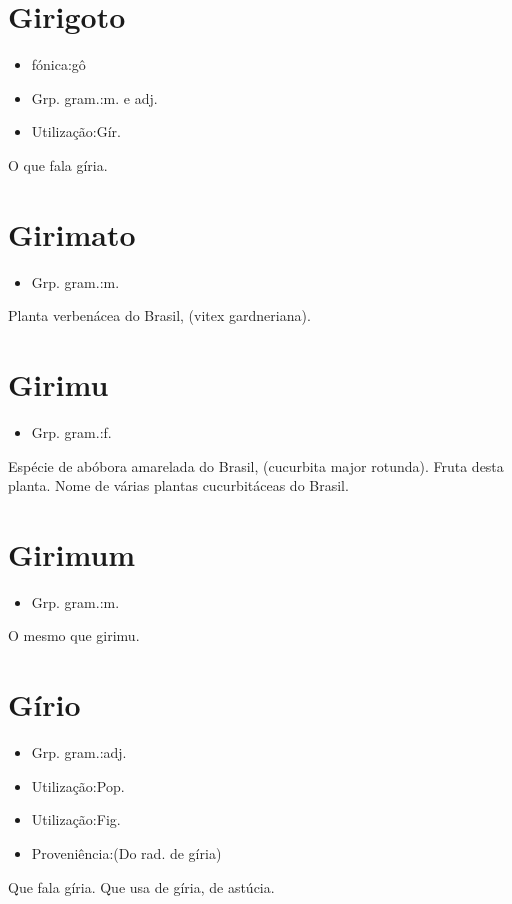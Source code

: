 \section{Girigoto}
\begin{itemize}
\item {fónica:gô}
\end{itemize}
\begin{itemize}
\item {Grp. gram.:m.  e  adj.}
\end{itemize}
\begin{itemize}
\item {Utilização:Gír.}
\end{itemize}
O que fala gíria.
\section{Girimato}
\begin{itemize}
\item {Grp. gram.:m.}
\end{itemize}
Planta verbenácea do Brasil, (\textunderscore vitex gardneriana\textunderscore ).
\section{Girimu}
\begin{itemize}
\item {Grp. gram.:f.}
\end{itemize}
Espécie de abóbora amarelada do Brasil, (\textunderscore cucurbita major rotunda\textunderscore ).
Fruta desta planta.
Nome de várias plantas cucurbitáceas do Brasil.
\section{Girimum}
\begin{itemize}
\item {Grp. gram.:m.}
\end{itemize}
O mesmo que \textunderscore girimu\textunderscore .
\section{Gírio}
\begin{itemize}
\item {Grp. gram.:adj.}
\end{itemize}
\begin{itemize}
\item {Utilização:Pop.}
\end{itemize}
\begin{itemize}
\item {Utilização:Fig.}
\end{itemize}
\begin{itemize}
\item {Proveniência:(Do rad. de \textunderscore gíria\textunderscore )}
\end{itemize}
Que fala gíria.
Que usa de gíria, de astúcia.

